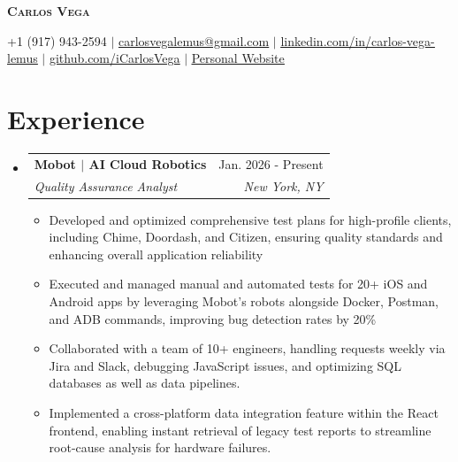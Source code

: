\documentclass[letterpaper,10pt]{article}
\makeatletter
\newcommand{\resumeItem}[1]{
  \item\small{
    {#1 \vspace{-2pt}}
  }
}
\newcommand{\resumeSubheading}[4]{
  \vspace{-2pt}\item
    \begin{tabular*}{0.97\textwidth}[t]{l@{\extracolsep{\fill}}r}
      \textbf{#1} & #2 \\
      \textit{\small#3} & \textit{\small #4} \\
    \end{tabular*}\vspace{-7pt}
}
\newcommand{\resumeSubHeadingListStart}{\begin{itemize}[leftmargin=0.15in, label={}]}
\newcommand{\resumeSubHeadingListEnd}{\end{itemize}}
\newcommand{\resumeItemListStart}{\begin{itemize}}
\newcommand{\resumeItemListEnd}{\end{itemize}\vspace{-5pt}}
\makeatother
\begin{document}
\begin{center}
    \textbf{\Huge \scshape Carlos Vega}
\end{center}

\begin{center}
\vspace{-.3cm}
\small +1 (917) 943-2594 $|$
\href{mailto:carlosvegalemus@gmail.com}{\underline{carlosvegalemus@gmail.com}} $|$
\href{https://www.linkedin.com/in/carlos-vega-lemus/}{\underline{linkedin.com/in/carlos-vega-lemus}} $|$
\href{https://github.com/iCarlosVega}{\underline{github.com/iCarlosVega}} $|$
\href{https://carlos-vega.co/}
{\underline{Personal Website}}
\end{center}
\vspace{-.6cm}



\section{Experience}
  \resumeSubHeadingListStart
      \resumeSubheading
      {Mobot $|$ AI Cloud Robotics}{Jan. 2026 - Present}
      {Quality Assurance Analyst}{New York, NY}
      \resumeItemListStart
        \resumeItem{Developed and optimized comprehensive test plans for high-profile clients, including Chime, Doordash, and Citizen, ensuring quality standards and enhancing overall application reliability}
        \resumeItem{Executed and managed manual and automated tests for 20+ iOS and Android apps by leveraging Mobot's robots alongside Docker, Postman, and ADB commands, improving bug detection rates by 20\%}
        \resumeItem{Collaborated with a team of 10+ engineers, handling requests weekly via Jira and Slack, debugging JavaScript issues, and optimizing SQL databases as well as data pipelines.}
        \resumeItem{Implemented a cross-platform data integration feature within the React frontend, enabling instant retrieval of legacy test reports to streamline root-cause analysis for hardware failures.}
      \resumeItemListEnd
  \resumeSubHeadingListEnd
\end{document}

